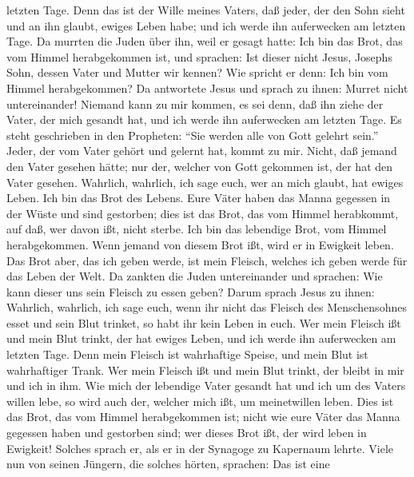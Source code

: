 letzten Tage.  Denn das ist der Wille meines Vaters, daß
jeder, der den Sohn sieht und an ihn glaubt, ewiges Leben habe; und ich
werde ihn auferwecken am letzten Tage.  Da murrten die
Juden über ihn, weil er gesagt hatte: Ich bin das Brot, das vom Himmel
herabgekommen ist,  und sprachen: Ist dieser nicht Jesus,
Josephs Sohn, dessen Vater und Mutter wir kennen? Wie spricht er denn:
Ich bin vom Himmel herabgekommen?  Da antwortete Jesus
und sprach zu ihnen: Murret nicht untereinander!  Niemand
kann zu mir kommen, es sei denn, daß ihn ziehe der Vater, der mich
gesandt hat, und ich werde ihn auferwecken am letzten Tage.
 Es steht geschrieben in den Propheten: ``Sie werden alle
von Gott gelehrt sein.'' Jeder, der vom Vater gehört und gelernt hat,
kommt zu mir.  Nicht, daß jemand den Vater gesehen hätte;
nur der, welcher von Gott gekommen ist, der hat den Vater gesehen.
 Wahrlich, wahrlich, ich sage euch, wer an mich glaubt,
hat ewiges Leben.  Ich bin das Brot des Lebens.
 Eure Väter haben das Manna gegessen in der Wüste und
sind gestorben;  dies ist das Brot, das vom Himmel
herabkommt, auf daß, wer davon ißt, nicht sterbe.  Ich
bin das lebendige Brot, vom Himmel herabgekommen. Wenn jemand von diesem
Brot ißt, wird er in Ewigkeit leben. Das Brot aber, das ich geben werde,
ist mein Fleisch, welches ich geben werde für das Leben der Welt.
 Da zankten die Juden untereinander und sprachen: Wie
kann dieser uns sein Fleisch zu essen geben?  Darum
sprach Jesus zu ihnen: Wahrlich, wahrlich, ich sage euch, wenn ihr nicht
das Fleisch des Menschensohnes esset und sein Blut trinket, so habt ihr
kein Leben in euch.  Wer mein Fleisch ißt und mein Blut
trinkt, der hat ewiges Leben, und ich werde ihn auferwecken am letzten
Tage.  Denn mein Fleisch ist wahrhaftige Speise, und mein
Blut ist wahrhaftiger Trank.  Wer mein Fleisch ißt und
mein Blut trinkt, der bleibt in mir und ich in ihm.  Wie
mich der lebendige Vater gesandt hat und ich um des Vaters willen lebe,
so wird auch der, welcher mich ißt, um meinetwillen leben.
 Dies ist das Brot, das vom Himmel herabgekommen ist;
nicht wie eure Väter das Manna gegessen haben und gestorben sind; wer
dieses Brot ißt, der wird leben in Ewigkeit!  Solches
sprach er, als er in der Synagoge zu Kapernaum lehrte. 
Viele nun von seinen Jüngern, die solches hörten, sprachen: Das ist eine
